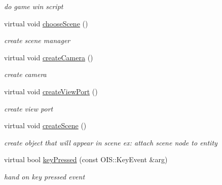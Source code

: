 \begin{DoxyCompactItemize}
\begin{DoxyCompactList}\small\item\em do game win script \end{DoxyCompactList}\item 
\hypertarget{class_stage1_aeee21dc6fad9198dd6f4ee538b4ffa82}{
virtual void \hyperlink{class_stage1_aeee21dc6fad9198dd6f4ee538b4ffa82}{chooseScene} ()}
\label{class_stage1_aeee21dc6fad9198dd6f4ee538b4ffa82}

\begin{DoxyCompactList}\small\item\em create scene manager \end{DoxyCompactList}\item 
\hypertarget{class_stage1_a7491d8806225ef133ee605116698f0ac}{
virtual void \hyperlink{class_stage1_a7491d8806225ef133ee605116698f0ac}{createCamera} ()}
\label{class_stage1_a7491d8806225ef133ee605116698f0ac}

\begin{DoxyCompactList}\small\item\em create camera \end{DoxyCompactList}\item 
\hypertarget{class_stage1_a5b0812d48f107953b5711c309dd53a05}{
virtual void \hyperlink{class_stage1_a5b0812d48f107953b5711c309dd53a05}{createViewPort} ()}
\label{class_stage1_a5b0812d48f107953b5711c309dd53a05}

\begin{DoxyCompactList}\small\item\em create view port \end{DoxyCompactList}\item 
\hypertarget{class_stage1_ab471d3f084b72248d02fb60e5e2836fd}{
virtual void \hyperlink{class_stage1_ab471d3f084b72248d02fb60e5e2836fd}{createScene} ()}
\label{class_stage1_ab471d3f084b72248d02fb60e5e2836fd}

\begin{DoxyCompactList}\small\item\em create object that will appear in scene ex: attach scene node to entity \end{DoxyCompactList}\item 
\hypertarget{class_stage1_af4f9d9df5df254ac6f1bc99cfda85511}{
virtual bool \hyperlink{class_stage1_af4f9d9df5df254ac6f1bc99cfda85511}{keyPressed} (const OIS::KeyEvent \&arg)}
\label{class_stage1_af4f9d9df5df254ac6f1bc99cfda85511}

\begin{DoxyCompactList}\small\item\em hand on key pressed event \end{DoxyCompactList}\end{DoxyCompactItemize}


